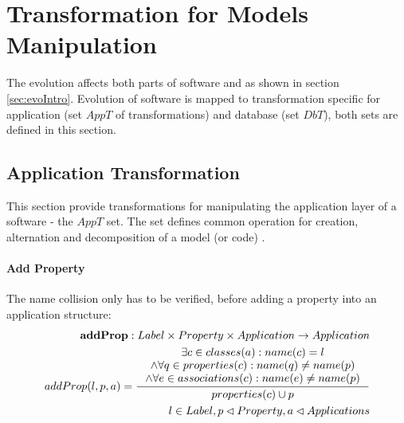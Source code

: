 \documentclass[11pt]{article}
\begin{document}
\section{Transformation for Models Manipulation}
The evolution affects both parts of software and as shown in section \ref{sec:evoIntro}. Evolution of software is mapped to transformation specific for application (set $AppT$ of transformations) and database (set $DbT$), both sets are defined in this section.

\subsection{Application Transformation}
This section provide transformations for manipulating the application layer of a software - the $AppT$ set. The set defines common operation for creation, alternation and decomposition of a model (or code) .


\paragraph{Add Property} The name collision only has to be verified, before adding a property into an application structure:
\begin{align*}
 	\mathbf{addProp} : Label \times Property \times Application \rightarrow Application \\
	addProp(l, p, a) = \inference{\exists c \in classes(a) : name(c) = l \\ \wedge \forall q \in  properties(c) : name(q) \neq name(p) \\ \wedge \forall e \in associations(c) : name(e) \neq name(p)}{properties(c) \cup p } \\
	l \in Label, p \lhd Property, a \lhd Applications
\end{align*}
\end{document}
